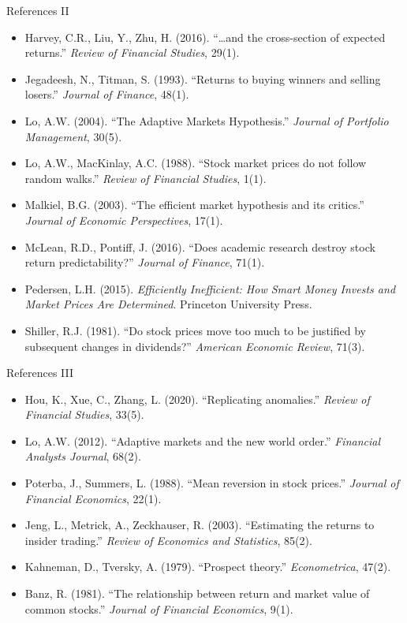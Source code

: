 \documentclass[9pt, aspectratio=169, t]{beamer}
\theoremstyle{definition}
\newenvironment{cminipage}[1]{%
    \par\noindent\hfill\begin{minipage}{#1}\ignorespaces
}{%
    \end{minipage}\hfill\null\par
}
\begin{document}
\begin{frame}{References II}
\begin{cminipage}{0.95\textwidth}
{\small
\begin{itemize}\setlength{\itemsep}{2pt}
    \item Harvey, C.R., Liu, Y., Zhu, H. (2016). ``\ldots and the cross-section of expected returns.'' \textit{Review of Financial Studies}, 29(1).
    \item Jegadeesh, N., Titman, S. (1993). ``Returns to buying winners and selling losers.'' \textit{Journal of Finance}, 48(1).
    \item Lo, A.W. (2004). ``The Adaptive Markets Hypothesis.'' \textit{Journal of Portfolio Management}, 30(5).
    \item Lo, A.W., MacKinlay, A.C. (1988). ``Stock market prices do not follow random walks.'' \textit{Review of Financial Studies}, 1(1).
    \item Malkiel, B.G. (2003). ``The efficient market hypothesis and its critics.'' \textit{Journal of Economic Perspectives}, 17(1).
    \item McLean, R.D., Pontiff, J. (2016). ``Does academic research destroy stock return predictability?'' \textit{Journal of Finance}, 71(1).
    \item Pedersen, L.H. (2015). \textit{Efficiently Inefficient: How Smart Money Invests and Market Prices Are Determined}. Princeton University Press.
    \item Shiller, R.J. (1981). ``Do stock prices move too much to be justified by subsequent changes in dividends?'' \textit{American Economic Review}, 71(3).
\end{itemize}
}
\end{cminipage}
\end{frame}

\begin{frame}{References III}
\begin{cminipage}{0.95\textwidth}
{\small
\begin{itemize}\setlength{\itemsep}{2pt}
    \item Hou, K., Xue, C., Zhang, L. (2020). ``Replicating anomalies.'' \textit{Review of Financial Studies}, 33(5).
    \item Lo, A.W. (2012). ``Adaptive markets and the new world order.'' \textit{Financial Analysts Journal}, 68(2).
    \item Poterba, J., Summers, L. (1988). ``Mean reversion in stock prices.'' \textit{Journal of Financial Economics}, 22(1).
    \item Jeng, L., Metrick, A., Zeckhauser, R. (2003). ``Estimating the returns to insider trading.'' \textit{Review of Economics and Statistics}, 85(2).
    \item Kahneman, D., Tversky, A. (1979). ``Prospect theory.'' \textit{Econometrica}, 47(2).
    \item Banz, R. (1981). ``The relationship between return and market value of common stocks.'' \textit{Journal of Financial Economics}, 9(1).
\end{itemize}
}
\end{cminipage}
\end{frame}
\end{document}
